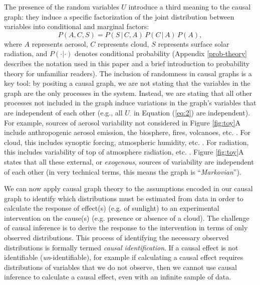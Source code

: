 \documentclass[12pt]{article}
\begin{document}
The presence of the random variables $U$ introduce a third meaning to
the causal graph: they induce a specific factorization of the joint
distribution between variables into conditional and marginal factors:
\begin{equation}
  P(A, C, S) = P(S \, | \,C, A) \, P(C \, | \, A) \, P(A),
\end{equation}
where $A$ represents aerosol, $C$ represents cloud, $S$ represents
surface solar radiation, and $P(\cdot | \cdot)$ denotes conditional
probability (Appendix \ref{prob-theory} describes the notation used in
this paper and a brief introduction to probability theory for
unfamiliar readers). The inclusion of randomness in causal graphs is a
key tool: by positing a causal graph, we are not stating that the
variables in the graph are the only processes in the system. Instead,
we are stating that all other processes not included in the graph
induce variations in the graph's variables that are independent of
each other (e.g., all $U_{\cdot}$ in Equation (\ref{eq:2}) are
independent). For example, sources of aerosol variability not
considered in Figure \ref{fig:toy}A include anthropogenic aerosol
emission, the biosphere, fires, volcanoes,
etc. \citep[e.g.,][]{Boucher2015}. For cloud, this includes synoptic
forcing, atmospheric humidity,
etc. \citep[e.g.,][]{wallace2006atmospheric}. For radiation, this
includes variability of top of atmosphere radiation,
etc. \citep[e.g.,][]{hartmann2015global}. Figure \ref{fig:toy}A states
that all these external, or \textit{exogenous}, sources of variability
are independent of each other (in very technical terms, this means the
graph is ``\textit{Markovian}'').

We can now apply causal graph theory
\citep[e.g.,][]{pearl1995causal,shpitser2006} to the assumptions
encoded in our causal graph to identify which distributions must be
estimated from data in order to calculate the response of effect(s)
(e.g. of sunlight) to an experimental intervention on the cause(s)
(e.g. presence or absence of a cloud). The challenge of causal
inference is to derive the response to the intervention in terms of
only observed distributions. This process of identifying the necessary
observed distributions is formally termed \emph{causal
  identification}. If a causal effect is not identifiable
(\emph{un}-identifiable), for example if calculating a causal effect
requires distributions of variables that we do not observe, then we
cannot use causal inference to calculate a causal effect, even with an
infinite sample of data.
\end{document}

